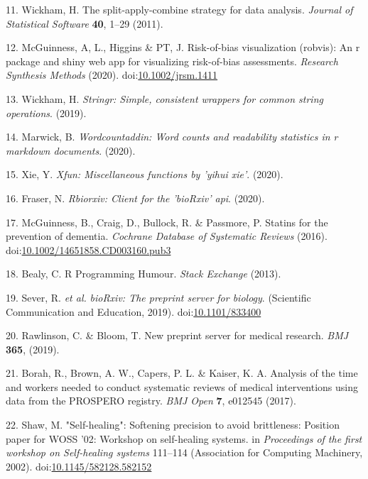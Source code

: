 \documentclass[a4paper, twoside]{templates/ociamthesis}
\begin{document}
\leavevmode\hypertarget{ref-plyr}{}%
11. Wickham, H. The split-apply-combine strategy for data analysis. \emph{Journal of Statistical Software} \textbf{40}, 1--29 (2011).

\leavevmode\hypertarget{ref-robvis}{}%
12. McGuinness, A, L., Higgins \& PT, J. Risk-of-bias visualization (robvis): An r package and shiny web app for visualizing risk-of-bias assessments. \emph{Research Synthesis Methods} (2020). doi:\href{https://doi.org/10.1002/jrsm.1411}{10.1002/jrsm.1411}

\leavevmode\hypertarget{ref-stringr}{}%
13. Wickham, H. \emph{Stringr: Simple, consistent wrappers for common string operations}. (2019).

\leavevmode\hypertarget{ref-wordcountaddin}{}%
14. Marwick, B. \emph{Wordcountaddin: Word counts and readability statistics in r markdown documents}. (2020).

\leavevmode\hypertarget{ref-xfun}{}%
15. Xie, Y. \emph{Xfun: Miscellaneous functions by 'yihui xie'}. (2020).

\leavevmode\hypertarget{ref-rbiorxiv}{}%
16. Fraser, N. \emph{Rbiorxiv: Client for the 'bioRxiv' api}. (2020).

\leavevmode\hypertarget{ref-mcguinness2016b}{}%
17. McGuinness, B., Craig, D., Bullock, R. \& Passmore, P. Statins for the prevention of dementia. \emph{Cochrane Database of Systematic Reviews} (2016). doi:\href{https://doi.org/10.1002/14651858.CD003160.pub3}{10.1002/14651858.CD003160.pub3}

\leavevmode\hypertarget{ref-bealy2013}{}%
18. Bealy, C. R Programming Humour. \emph{Stack Exchange} (2013).

\leavevmode\hypertarget{ref-sever2019}{}%
19. Sever, R. \emph{et al.} \emph{bioRxiv: The preprint server for biology}. (Scientific Communication and Education, 2019). doi:\href{https://doi.org/10.1101/833400}{10.1101/833400}

\leavevmode\hypertarget{ref-rawlinson2019}{}%
20. Rawlinson, C. \& Bloom, T. New preprint server for medical research. \emph{BMJ} \textbf{365}, (2019).

\leavevmode\hypertarget{ref-borah2017}{}%
21. Borah, R., Brown, A. W., Capers, P. L. \& Kaiser, K. A. Analysis of the time and workers needed to conduct systematic reviews of medical interventions using data from the PROSPERO registry. \emph{BMJ Open} \textbf{7}, e012545 (2017).

\leavevmode\hypertarget{ref-shaw2002}{}%
22. Shaw, M. "Self-healing": Softening precision to avoid brittleness: Position paper for WOSS '02: Workshop on self-healing systems. in \emph{Proceedings of the first workshop on Self-healing systems} 111--114 (Association for Computing Machinery, 2002). doi:\href{https://doi.org/10.1145/582128.582152}{10.1145/582128.582152}
\end{document}
